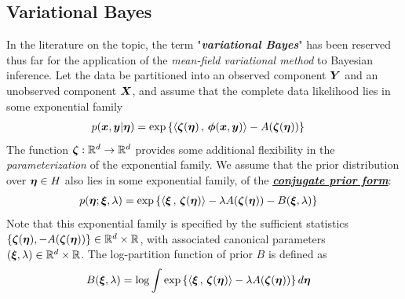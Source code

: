 \documentclass[11pt]{article}
\begin{document}
\subsection{Variational Bayes}
In the literature on the topic, the term "\emph{\textbf{variational Bayes}}" has been reserved thus far for the application of the \emph{mean-field variational method} to Bayesian inference. Let the data be partitioned into an observed component $\boldsymbol{Y}$ and an unobserved component $\boldsymbol{X}$, and assume that the complete data likelihood lies in some exponential family
\begin{align}
p(\boldsymbol{x}, \boldsymbol{y}| \boldsymbol{\eta}) &= \exp\left\{\left\langle \boldsymbol{\zeta}(\boldsymbol{\eta})\,,\, \boldsymbol{\phi}(\boldsymbol{x}, \boldsymbol{y}) \right\rangle - A(\boldsymbol{\zeta}(\boldsymbol{\eta}))\right\} \label{eqn: var_bayes_joint}
\end{align} The function $\boldsymbol{\zeta} : {\mathbb R}^d \rightarrow  {\mathbb R}^d$ provides some additional flexibility in the \emph{parameterization} of the exponential family. We assume  that the prior distribution over $\boldsymbol{\eta} \in H$ also lies in some exponential family, of the \underline{\emph{\textbf{conjugate prior form}}}:
\begin{align}
p(\boldsymbol{\eta}; \boldsymbol{\xi}, \lambda) &= \exp\left\{\left\langle \boldsymbol{\xi}\,,\, \boldsymbol{\zeta}(\boldsymbol{\eta}) \right\rangle - \lambda A(\boldsymbol{\zeta}(\boldsymbol{\eta})) - B(\boldsymbol{\xi}, \lambda)\right\}  \label{eqn: var_bayes_conjugate_prior}
\end{align} Note that this exponential family is specified by the sufficient statistics $\{\boldsymbol{\zeta}(\boldsymbol{\eta}), -A(\boldsymbol{\zeta}(\boldsymbol{\eta})) \} \in {\mathbb R}^d \times {\mathbb R}$, with associated canonical parameters
$(\boldsymbol{\xi}, \lambda) \in {\mathbb R}^d \times {\mathbb R}$. The log-partition function of prior $B$ is defined as
\begin{align*}
B(\boldsymbol{\xi}, \lambda) &= \log \int  \exp\left\{\left\langle \boldsymbol{\xi}\,,\, \boldsymbol{\zeta}(\boldsymbol{\eta}) \right\rangle - \lambda A(\boldsymbol{\zeta}(\boldsymbol{\eta}))\right\} d\boldsymbol{\eta}
\end{align*}
\end{document}
